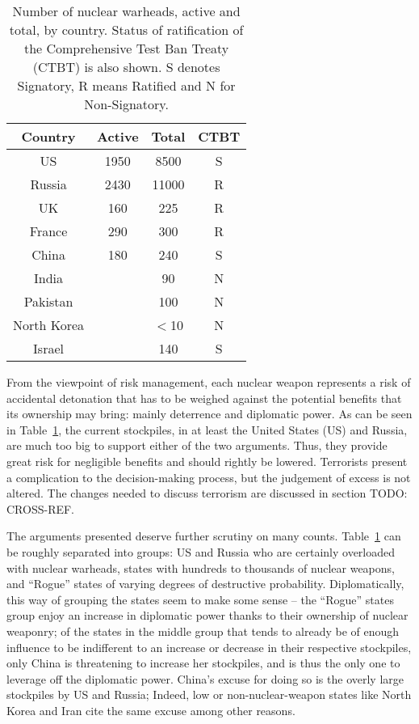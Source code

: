 \documentclass[twoside,titlepage,11pt,twocolumn,a4paper]{article}
\begin{document}
\begin{table}
  \begin{tabular}{|c|c|c|c|}
    \hline
    Country	& Active& Total		& CTBT	\\
    \hline
    US		& 1950 	& 8500		& S	\\
    Russia	& 2430 	& 11000		& R	\\
    UK		& 160 	& 225		& R	\\
    France	& 290	& 300		& R	\\
    China	& 180	& 240		& S	\\
    India	&	& 90		& N	\\
    Pakistan	&	& 100		& N	\\
    North Korea	&	& \(<\)10	& N	\\
    Israel	&	& 140		& S	\\
    \hline
  \end{tabular}
  \caption{Number of nuclear warheads, active and total, by
    country. Status of ratification of the Comprehensive Test Ban
    Treaty (CTBT) is also shown. S denotes Signatory, R means Ratified
    and N for Non-Signatory. \citep{worldNuclearForces2011}}
  \label{tab:NWSwarheadsCTBT}
\end{table}

From the viewpoint of risk management, each nuclear weapon represents
a risk of accidental detonation that has to be weighed against the
potential benefits that its ownership may bring: mainly deterrence and
diplomatic power. As can be seen in Table~\ref{tab:NWSwarheadsCTBT},
the current stockpiles, in at least the United States (US) and Russia,
are much too big to support either of the two arguments. Thus, they
provide great risk for negligible benefits and should rightly be
lowered. Terrorists present a complication to the decision-making
process, but the judgement of excess is not altered. The changes
needed to discuss terrorism are discussed in section TODO: CROSS-REF.

The arguments presented deserve further scrutiny on many
counts. Table~\ref{tab:NWSwarheadsCTBT} can be roughly separated into
groups: US and Russia who are certainly overloaded with nuclear
warheads, states with hundreds to thousands of nuclear weapons, and
``Rogue'' states of varying degrees of destructive
probability. Diplomatically, this way of grouping the states seem to
make some sense -- the ``Rogue'' states group enjoy an increase in
diplomatic power thanks to their ownership of nuclear weaponry; of the
states in the middle group that tends to already be of enough
influence to be indifferent to an increase or decrease in their
respective stockpiles, only China is threatening to increase her
stockpiles, and is thus the only one to leverage off the diplomatic
power. China's excuse for doing so is the overly large stockpiles by
US and Russia; Indeed, low or non-nuclear-weapon states like North
Korea and Iran cite the same excuse among other reasons. 
\end{document}
